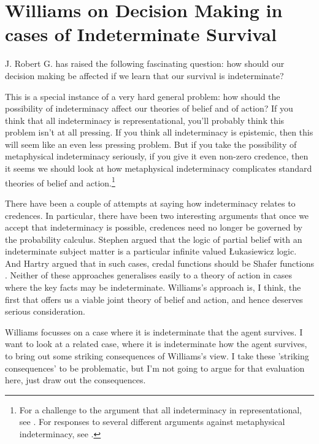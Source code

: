 \newcommand{\pictextjrgw}[3]{
\put(#1, #2){\makebox(0, 0)[b]{#3}}}

\chapter[Indeterminate Survival]{Williams on Decision Making in cases of Indeterminate Survival}

J. Robert G. \citet{Williams2013} has raised the following fascinating question: how should our decision making be affected if we learn that our survival is indeterminate? 

This is a special instance of a very hard general problem: how should the possibility of indeterminacy affect our theories of belief and of action? If you think that all indeterminacy is representational, you'll probably think this problem isn't at all pressing. If you think all indeterminacy is epistemic, then this will seem like an even less pressing problem. But if you take the possibility of metaphysical indeterminacy seriously, if you give it even non-zero credence, then it seems we should look at how metaphysical indeterminacy complicates standard theories of belief and action.\footnote{For a challenge to the argument that all indeterminacy in representational, see \citet{Merricks2001}. For responses to several different arguments against metaphysical indeterminacy, see \citet{Barnes2010}.}

There have been a couple of attempts at saying how indeterminacy relates to credences. In particular, there have been two interesting arguments that once we accept that indeterminacy is possible, credences need no longer be governed by the probability calculus. Stephen \citet{Schiffer2000a} argued that the logic of partial belief with an indeterminate subject matter is a particular infinite valued \L{}ukasiewicz logic. And Hartry \citet{Field2000} argued that in such cases, credal functions should be Shafer functions \citep{Shafer1976}. Neither of these approaches generalises easily to a theory of action in cases where the key facts may be indeterminate. Williams's approach is, I think, the first that offers us a viable joint theory of belief and action, and hence deserves serious consideration.

Williams focusses on a case where it is indeterminate that the agent survives. I want to look at a related case, where it is indeterminate how the agent survives, to bring out some striking consequences of Williams's view. I take these 'striking consequences' to be problematic, but I'm not going to argue for that evaluation here, just draw out the consequences.

